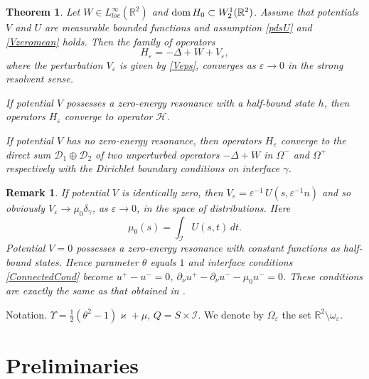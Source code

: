 \documentclass[reqno]{amsart}
\theoremstyle{plain}
\newtheorem{thm}{Theorem}
\newtheorem{rem}{Remark}
\numberwithin{equation}{section}
\newcommand{\dom}{\mathop{\rm dom}}
\renewcommand{\kappa}{\varkappa}
\newcommand{\Real}{\mathbb R}
\newcommand{\eps}{\varepsilon}
\newcommand{\cI}{\mathcal{I}}
\begin{document}
\begin{thm}\label{MainThrm}
Let $W\in L^\infty_{loc}(\Real^2)$ and  $\dom H_0\subset W_2^1(\Real^2)$.
Assume  that potentials $V$ and $U$  are measurable bounded functions and assumption \eqref{pdsU} and \eqref{Vzeromean}  holds.
Then the family of operators
\begin{equation*}
 H_\eps=-\Delta +W+V_\eps,
\end{equation*}
where the perturbation $V_\eps$ is given by \eqref{Veps},
converges as $\eps\to 0$ in the strong resolvent sense.

If potential $V$ possesses a zero-energy resonance with a half-bound state $h$, then operators $H_\eps$ converge to  operator $\mathcal{H}$.

If potential $V$ has no zero-energy resonance, then operators $H_\eps$ converge to the direct sum $\mathcal{D}_1\oplus\mathcal{D}_2$ of two unperturbed operators $-\Delta +W$ in $\Omega^-$ and $\Omega^+$ respectively with the Dirichlet boundary conditions on interface $\gamma$.
\end{thm}


\begin{rem}
  If potential $V$ is identically zero, then $V_\eps=\eps^{-1}\,U\left(s,\eps^{-1}n\right)$ and so obviously
$V_\eps\to \mu_0 \delta_\gamma$, as $\eps\to 0$, in the space of distributions. Here
\begin{equation}\label{Mu0}
  \mu_0(s)=\int_{\cI}U(s,t)\, dt.
\end{equation}
Potential $V=0$ possesses a zero-energy resonance with constant functions as  half-bound states. Hence parameter $\theta$ equals  $1$ and interface conditions \eqref{ConnectedCond} become
$ u^+- u^-=0$,  $\partial_\nu u^+-\partial_\nu u^-
-\mu_0 u^-=0$. These conditions are exactly the same as that obtained in \cite{BehrndtExnerHolzmannLotoreichik2017}.
\end{rem}


Notation. $\Upsilon=\tfrac12(\theta^2-1)\kappa+\mu$, $Q=S\times \cI$.
We denote by $\Omega_\eps$ the set $\Real^2\setminus\omega_\eps$.




\section{Preliminaries}
\end{document}
